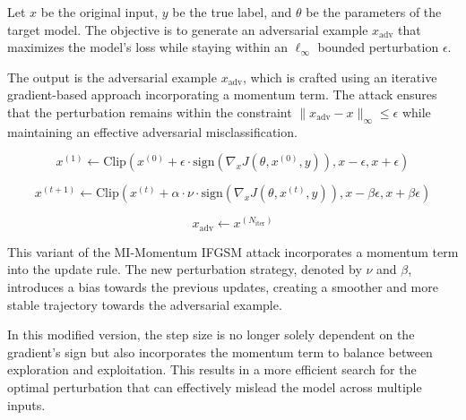 Let \( x \) be the original input, \( y \) be the true label, and \( \theta \) be the parameters of the target model. The objective is to generate an adversarial example \( x_{\text{adv}} \) that maximizes the model's loss while staying within an \(\ell_{\infty}\) bounded perturbation \(\epsilon\).

The output is the adversarial example \( x_{\text{adv}} \), which is crafted using an iterative gradient-based approach incorporating a momentum term. The attack ensures that the perturbation remains within the constraint \( \|x_{\text{adv}} - x\|_{\infty} \leq \epsilon \) while maintaining an effective adversarial misclassification.

\[
x^{(1)} \leftarrow \text{Clip}\left(x^{(0)} + \epsilon \cdot \text{sign}(\nabla_x J(\theta, x^{(0)}, y)), x - \epsilon, x + \epsilon\right)
\]

\[
x^{(t+1)} \leftarrow \text{Clip}\left(x^{(t)} + \alpha \cdot \nu \cdot \text{sign}(\nabla_x J(\theta, x^{(t)}, y)), x - \beta \epsilon, x + \beta \epsilon\right)
\]

\[
x_{\text{adv}} \leftarrow x^{(N_{\text{iter}})}
\]

This variant of the MI-Momentum IFGSM attack incorporates a momentum term into the update rule. The new perturbation strategy, denoted by $\nu$ and $\beta$, introduces a bias towards the previous updates, creating a smoother and more stable trajectory towards the adversarial example.

In this modified version, the step size is no longer solely dependent on the gradient's sign but also incorporates the momentum term to balance between exploration and exploitation. This results in a more efficient search for the optimal perturbation that can effectively mislead the model across multiple inputs.